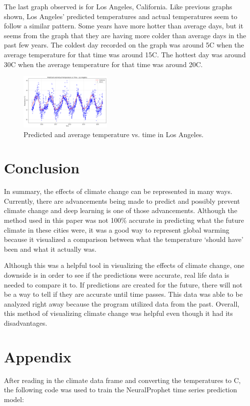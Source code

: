 \documentclass[11pt,a4paper,fleqn]{article}
\begin{document}
The last graph observed is for Los Angeles, California. Like previous graphs shown, Los Angeles' predicted temperatures and actual temperatures seem to follow a similar pattern. Some years have more hotter than average days, but it seems from the graph that they are having more colder than average days in the past few years. The coldest day recorded on the graph was around 5\textdegree C when the average temperature for that time was around 15\textdegree C. The hottest day was around 30\textdegree C when the average temperature for that time was around 20\textdegree C.

\begin{figure}[h]
    \centering
    \includegraphics[width=0.4\textwidth]{Los Angeles.png}
    \caption{\label{fig:graph}Predicted and average temperature vs. time in Los Angeles.}
\end{figure}

\section{Conclusion}\label{sec:Conclusion}
In summary, the effects of climate change can be represented in many ways. Currently, there are advancements being made to predict and possibly prevent climate change and deep learning is one of those advancements. Although the method used in this paper was not 100\% accurate in predicting what the future climate in these cities were, it was a good way to represent global warming because it visualized a comparison between what the temperature `should have' been and what it actually was. \par
Although this was a helpful tool in visualizing the effects of climate change, one downside is in order to see if the predictions were accurate, real life data is needed to compare it to. If predictions are created for the future, there will not be a way to tell if they are accurate until time passes. This data was able to be analyzed right away because the program utilized data from the past. Overall, this method of visualizing climate change was helpful even though it had its disadvantages.

\section{Appendix}\label{sec:Appendix}
After reading in the climate data frame and converting the temperatures to \textdegree C, the following code was used to train the NeuralProphet time series prediction model:
\end{document}
